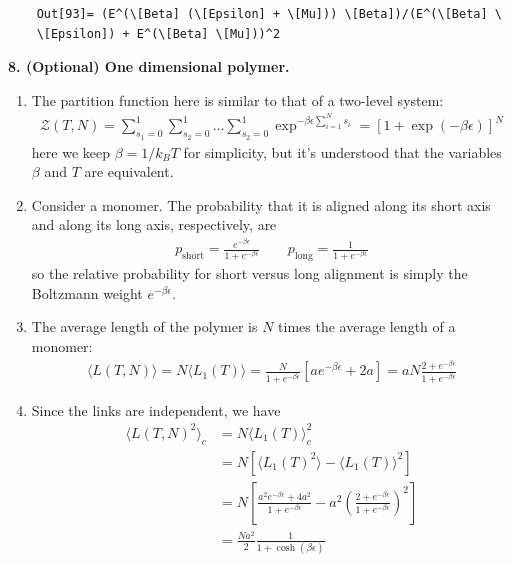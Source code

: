 \documentclass{article}
\theoremstyle{definition}
\newcommand{\be}{\beta}
\newcommand{\f}[2]{\frac{#1}{#2}}
\newcommand{\lp}{\left(}
\newcommand{\rp}{\right)}
\newcommand{\lb}{\left[}
\newcommand{\rb}{\right]}
\begin{document}
\begin{enumerate}[label=(\alph*)]
\begin{lstlisting}
 	Out[93]= (E^(\[Beta] (\[Epsilon] + \[Mu])) \[Beta])/(E^(\[Beta] \
 	\[Epsilon]) + E^(\[Beta] \[Mu]))^2
 	\end{lstlisting}
 	
\end{enumerate}



\noindent \textbf{8. (Optional) One dimensional polymer.}

\begin{enumerate}[label=(\alph*)]
	\item The partition function here is similar to that of a two-level system:
	\begin{align*}
	\mathcal{Z}(T,N) = \sum_{s_1=0}^1\sum_{s_2=0}^1\dots \sum_{s_2=0}^1 \exp^{-\be \epsilon \sum_{i=1}^N s_i}  = \boxed{\lb 1 + \exp(-\be\epsilon) \rb^N}
	\end{align*}
	here we keep $\be = 1/k_BT$ for simplicity, but it's understood that the variables $\be$ and $T$ are equivalent.
	
	\item Consider a monomer. The probability that it is aligned along its short axis and along its long axis, respectively, are 
	\begin{align*}
	\boxed{p_\text{short} = \f{e^{-\be\epsilon }}{1+ e^{-\be\epsilon}}\quad\quad p_\text{long} = \f{1}{1+e^{-\be\epsilon}}}
	\end{align*}
	so the relative probability for short versus long alignment is simply the Boltzmann weight $\boxed{e^{-\be\epsilon}}$.
	
	\item The average length of the polymer is $N$ times the average length of a monomer:
	\begin{align*}
	\langle L(T,N)\rangle = N\langle L_1(T) \rangle = \f{N}{1+e^{-\be\epsilon}}\lb a e^{-\be\epsilon} + 2a  \rb = \boxed{aN\f{{2+e^{-\be\epsilon}}}{1+e^{-\be\epsilon}}}
	\end{align*}
	
	\item Since the links are independent, we have
	\begin{align*}
	\langle L(T,N)^2\rangle_c 
	&= N\langle L_1(T) \rangle^2_c\\ 
	&= N\lb \langle L_1(T)^2 \rangle - \langle L_1(T)\rangle^2 \rb \\ 
	&= N\lb \f{a^2 e^{-\be\epsilon} + 4a^2}{1+e^{-\be\epsilon}} - a^2\lp \f{{2+e^{-\be\epsilon}}}{1+e^{-\be\epsilon}} \rp^2 \rb\\
	&= \boxed{\f{Na^2}{2}\f{1}{1+\cosh(\be\epsilon)}}
	\end{align*}
	

\end{enumerate}
\end{document}
